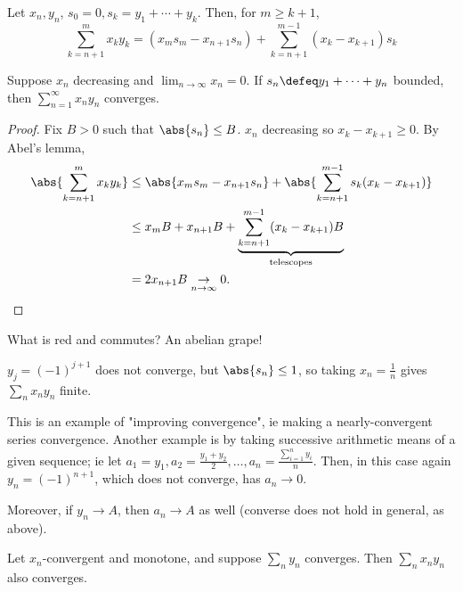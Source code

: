 \begin{lemma}[Abel's]
    Let $x_n, y_n$, $s_0 = 0, s_k = y_1 + \cdots + y_k$. Then, for $m \geq k + 1$, \[
    \sum_{k=n+1}^m x_k y_k = (x_m s_m - x_{n+1}s_n)     + \sum_{k=n+1}^{m-1} (x_k - x_{k+1})s_k
    \]
\end{lemma}
\begin{theorem}
    Suppose $x_n$ decreasing and $\lim_{n \to \infty} x_n = 0$. If $s_n \defeq y_1+ \cdots +y_n$ bounded, then $\sum_{n=1}^\infty x_n y_n$ converges.
\end{theorem}

\begin{proof}
    Fix $B > 0$ such that $\abs{s_n} \leq B$. $x_n$ decreasing so $x_{k} - x_{k+1} \geq 0$. By Abel's lemma, \begin{align*}
        \abs{\sum_{k=n+1}^m x_{k} y_k} &\leq \abs{x_m s_m - x_{n+1} s_n} + \abs{\sum_{k=n+1}^{m-1} s_k(x_k - x_{k+1})}\\
        &\leq x_m B + x_{n+1}B + \underbrace{\sum_{k=n+1}^{m-1} (x_{k} - x_{k+1})B}_{\text{telescopes}}\\
        &= 2 x_{n+1} B \underset{n \to \infty}{\to} 0.
    \end{align*}
\end{proof}

\begin{remark}
    What is red and commutes? An abelian grape!
\end{remark}


\begin{example}
    $y_j = (-1)^{j+1}$ does not converge, but $\abs{s_n} \leq 1$, so taking $x_n = \frac{1}{n}$ gives $\sum_n x_n y_n$ finite.

    This is an example of "improving convergence", ie making a nearly-convergent series convergence. Another example is by taking successive arithmetic means of a given sequence; ie let $a_1 = y_1, a_2 = \frac{y_1 + y_2}{2}, \dots, a_n = \frac{\sum_{i=1}^n y_i}{n}$. Then, in this case again $y_n = (-1)^{n+1}$, which does not converge, has $a_n \to 0$. 

    Moreover, if $y_n \to A$, then $a_n \to A$ as well (converse does not hold in general, as above).
\end{example}

\begin{theorem}
    Let $x_n$-convergent and monotone, and suppose $\sum_{n} y_n$ converges. Then $\sum_n x_n y_n$ also converges.
\end{theorem}

